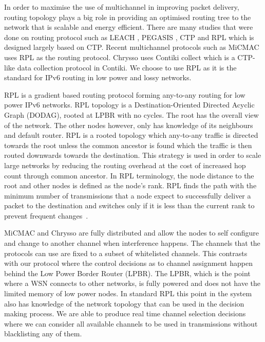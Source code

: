
In order to maximise the use of multichannel in improving packet delivery, routing topology plays a big role in providing an optimised routing tree to the network that is scalable and energy efficient. There are many studies that were done on routing protocol such as LEACH \cite{leach}, PEGASIS \cite{pegasis}, CTP \cite{ctp} and RPL which is designed largely based on CTP. Recent multichannel protocols such as MiCMAC uses RPL as the routing protocol. Chrysso uses Contiki collect which is a CTP-like data collection protocol in Contiki. We choose to use RPL as it is the standard for IPv6 routing in low power and lossy networks. %

RPL is a gradient based routing protocol forming any-to-any routing for low power IPv6 networks. RPL topology is a Destination-Oriented Directed Acyclic Graph (DODAG), rooted at LPBR with no cycles. The root has the overall view of the network. The other nodes however, only has knowledge of its neighbours and default router. RPL is a rooted topology which any-to-any traffic is directed towards the root unless the common ancestor is found which the traffic is then routed downwards towards the destination. This strategy is used in order to scale large networks by reducing the routing overhead at the cost of increased hop count through common ancestor. In RPL terminology, the node distance to the root and other nodes is defined as the node's rank. RPL finds the path with the minimum number of transmissions that a node expect to successfully deliver a packet to the destination and switches only if it is less than the current rank to prevent frequent changes~\cite{mrhof}. 

MiCMAC and Chrysso are fully distributed and allow the nodes to self configure and change to another channel when interference happens. The channels that the protocols can use are fixed to a subset of whitelisted channels. This contrasts with our protocol where the control decisions as to channel assignment happen behind the Low Power Border Router (LPBR). The LPBR, which is the point where a WSN connects to other networks, is fully powered and does not have the limited memory of low power nodes. In standard RPL this point in the system also has knowledge of the network topology that can be used in the decision making process. We are able to produce real time channel selection decisions where we can consider all available channels to be used in transmissions without blacklisting any of them.  

